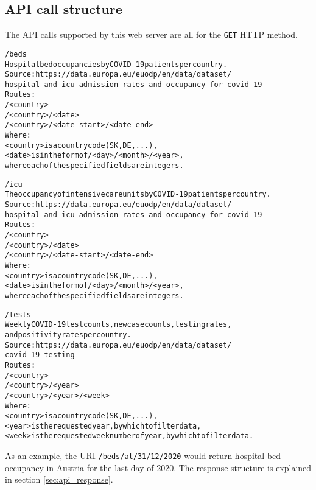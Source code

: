 \documentclass[pdftex, 11pt, a4paper]{article}
\newcommand{\code}{\texttt}
\begin{document}
    \subsection{API call structure} \label{sec:api_structure}
    The API calls supported by this web server are all for the \code{GET} HTTP method.

    \begin{alltt}
    /beds
        Hospital bed occupancies by COVID-19 patients per country.
        Source: https://data.europa.eu/euodp/en/data/dataset/
                    hospital-and-icu-admission-rates-and-occupancy-for-covid-19
        Routes:
            /<country>
            /<country>/<date>
            /<country>/<date-start>/<date-end>
        Where:
            <country>   is a country code (SK, DE, ...),
            <date>      is in the form of /<day>/<month>/<year>,
                        where each of the specified fields are integers.

    /icu
        The occupancy of intensive care units by COVID-19 patients per country.
        Source: https://data.europa.eu/euodp/en/data/dataset/
                    hospital-and-icu-admission-rates-and-occupancy-for-covid-19
        Routes:
            /<country>
            /<country>/<date>
            /<country>/<date-start>/<date-end>
        Where:
            <country>   is a country code (SK, DE, ...),
            <date>      is in the form of /<day>/<month>/<year>,
                        where each of the specified fields are integers.

    /tests
        Weekly COVID-19 test counts, new case counts, testing rates,
        and positivity rates per country.
        Source: https://data.europa.eu/euodp/en/data/dataset/
                    covid-19-testing
        Routes:
            /<country>
            /<country>/<year>
            /<country>/<year>/<week>
        Where:
            <country>   is a country code (SK, DE, ...),
            <year>      is the requested year, by which to filter data,
            <week>      is the requested week number of year, by which to filter data.
    \end{alltt}

    As an example, the URI \code{/beds/at/31/12/2020} would return hospital bed occupancy
    in Austria for the last day of 2020. The response structure is explained in
    section \ref{sec:api_response}.
\end{document}
